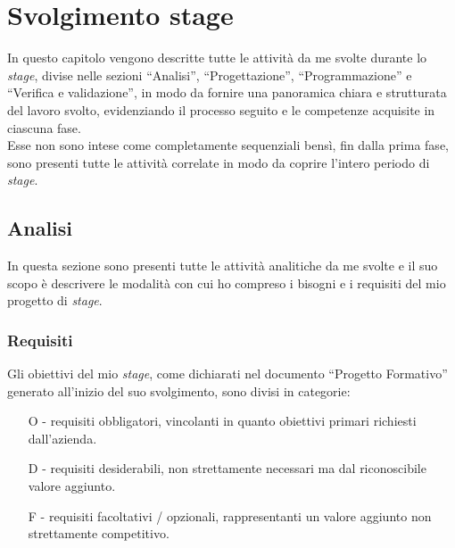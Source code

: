 \chapter{Svolgimento stage}
\label{cap:svolgimentoStage}
In questo capitolo vengono descritte tutte le attività da me svolte durante lo \emph{stage}, divise nelle sezioni “Analisi”, “Progettazione”, “Programmazione” e “Verifica e validazione”, in modo da fornire una panoramica chiara e strutturata del lavoro svolto, evidenziando il processo seguito e le competenze acquisite in ciascuna fase.\\
Esse non sono intese come completamente sequenziali bensì, fin dalla prima fase, sono presenti tutte le attività correlate in modo da coprire l'intero periodo di \emph{stage}.\\
\section{Analisi}
In questa sezione sono presenti tutte le attività analitiche da me svolte e il suo scopo è descrivere le modalità con cui ho compreso i bisogni e i requisiti del mio progetto di \emph{stage}. 

\subsection{Requisiti}
Gli obiettivi del mio \emph{stage}, come dichiarati nel documento “Progetto Formativo” generato all'inizio del suo svolgimento, sono divisi in categorie:
\begin{enumerate}
	\item[O -]requisiti obbligatori, vincolanti in quanto obiettivi primari richiesti dall'azienda.
    \item[D -]requisiti desiderabili, non strettamente necessari ma dal riconoscibile valore aggiunto.
    \item[F -]requisiti facoltativi / opzionali, rappresentanti un valore aggiunto non strettamente competitivo.\\
\end{enumerate}

